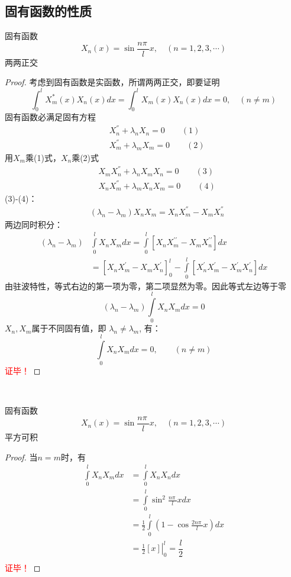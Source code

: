 \subsection{固有函数的性质}
\begin{proposition} 固有函数$$X_n(x)= \sin \dfrac{n\pi~}{l} x, \quad (n=1,2,3,\cdots)$$ 两两正交 
\end{proposition}
\begin{proof}
	考虑到固有函数是实函数，所谓两两正交，即要证明
	\[\int_0 ^l X^*_m(x) X_n(x) dx = \int_0 ^l X_m(x) X_n(x) dx =0, \quad (n\ne m)\]
	固有函数必满足固有方程
	$$ \begin{array}{llll}
			&X_n ^{''}+\lambda_n X_n=0 \qquad (1) \\
			&X_m ^{''}+\lambda_m X_m=0 \qquad (2)
		\end{array}  $$  
	用$X_m$乘(1)式，$X_n$乘(2)式
		$$\begin{array}{llll}
				&X_m X_n ^{''}+\lambda_n X_m X_n=0 \qquad (3)\\
				&X_nX_m ^{''}+\lambda_m X_n X_m=0 \qquad (4)
			\end{array}$$ 
	(3)-(4)：
			$$\begin{array}{llll}
					& (\lambda_n - \lambda_m) X_n X_m= X_n X_m ^{''}-X_m X_n ^{''} 
				\end{array}$$  
	两边同时积分：
			$$ 
			\begin{aligned}
					(\lambda_n - \lambda_m )& \int\limits_{0 } ^{l}  X_n X_m dx  =  \int\limits_{0} ^{l}  [ X_n X_m ^{\prime\prime} - X_m X_n ^{\prime\prime} ] dx \\  
					& = [ X_n X_m ^{'} - X_m X_n ^{'} ] _0 ^{l} - \int\limits_{0} ^{l} [ X_n ^{'} X_m ^{'} - X_m ^{'} X_n ^{'} ] dx  
				\end{aligned}$$
	由驻波特性，等式右边的第一项为零，第二项显然为零。因此等式左边等于零
	$$ (\lambda_n-\lambda_m) \int\limits_{0 }^{l}  X_n X_m dx=0   $$ 
	$X_n, X_m$属于不同固有值，即 $\lambda_n \ne \lambda_m$, 有：
	$$ \int\limits_{0 }^{l}  X_n X_m dx=0 , \qquad (n\ne m)  $$  
\textcolor{red}{证毕！}
\end{proof}

~~\\ 
\begin{proposition}固有函数$$X_n(x)= \sin \dfrac{n\pi~}{l} x, \quad (n=1,2,3,\cdots)$$ 平方可积  
\end{proposition}
\begin{proof}
当$n= m$时，有   
$$ \begin{aligned}
			\int\limits_{0 }^{l}  X_n X_m dx&=\int\limits_{0 }^{l}  X_n X_n dx \\ &= \int\limits_{0 }^{l}   \sin ^2  \frac{n\pi~}{l} x dx \\
			&= \frac{1}{2}\int\limits_{0 }^{l}   (1-\cos   \frac{2n\pi~}{l} x) dx \\
			&= \left.\frac{1}{2}[x]\right|_0^l =  \dfrac{l}{2}  \\ 
\end{aligned}  $$ 
\textcolor{red}{证毕！} 
\end{proof}

